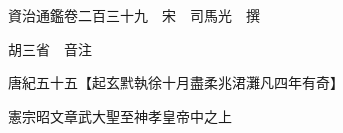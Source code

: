 










 


 
 


 

  
  
  
  
  





  
  
  
  
  
 
  

  

  
  
  



  

 
 

  
   




  

  
  


  　　資治通鑑卷二百三十九　宋　司馬光　撰

　　胡三省　音注

　　唐紀五十五【起玄黓執徐十月盡柔兆涒灘凡四年有奇】

　　憲宗昭文章武大聖至神孝皇帝中之上

